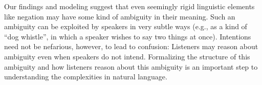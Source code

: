 \documentclass[floatsintext,doc]{apa6}
\begin{document}


Our findings and modeling suggest that even seemingly rigid linguistic elements like negation may have some kind of ambiguity in their meaning.
Such an ambiguity can be exploited by speakers in very subtle ways (e.g., as a kind of ``dog whistle'', in which a speaker wishes to say two things at once). 
Intentions need not be nefarious, however, to lead to confusion: Listeners may reason about ambiguity even when speakers do not intend.
Formalizing the structure of this ambiguity and how listeners reason about this ambiguity is an important step to understanding the complexities in natural language. 

%





\end{document}
